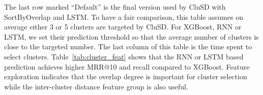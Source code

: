 The last row marked ``Default'' is the final version used by CluSD with SortByOverlap and LSTM.
To have a fair comparison, this table assumes on average either 3 or 5 clusters are targeted by CluSD.
For XGBoost, RNN or LSTM, we set their prediction threshold so that 
the average number of clusters is close to the targeted number.
The last column of this table is the time spent to select clusters. 
Table~\ref{tab:cluster_feat} shows that  the RNN or LSTM based prediction achieves  higher MRR@10 and recall compared to 
XGBoost. 
Feature exploration indicates that the overlap degree is important for  cluster selection
while the inter-cluster distance feature group is also useful. 



